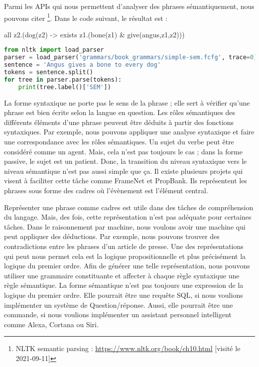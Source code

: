 \documentclass{KodeBook}
\begin{document}
Parmi les APIs qui nous permettent d'analyser des phrases sémantiquement, nous pouvons citer \footnote{NLTK semantic parsing : \url{https://www.nltk.org/book/ch10.html} [visité le 2021-09-11]}. 
Dans le code suivant, le résultat est : \\
\begin{center}
	all z2.(dog(z2) -> exists z1.(bone(z1) \& give(angus,z1,z2)))
\end{center}

\begin{lstlisting}[language=Python, style=codeStyle]
from nltk import load_parser
parser = load_parser('grammars/book_grammars/simple-sem.fcfg', trace=0)
sentence = 'Angus gives a bone to every dog'
tokens = sentence.split()
for tree in parser.parse(tokens):
    print(tree.label()['SEM'])
\end{lstlisting}


\begin{discussion}
La forme syntaxique ne porte pas le sens de la phrase ; elle sert à vérifier qu'une phrase est bien écrite selon la langue en question. 
Les rôles sémantiques des différents éléments d'une phrase peuvent être déduits à partir des fonctions syntaxiques. 
Par exemple, nous pouvons appliquer une analyse syntaxique et faire une correspondance avec les rôles sémantiques. 
Un sujet du verbe peut être considéré comme un agent. 
Mais, cela n'est pas toujours le cas ; dans la forme passive, le sujet est un patient. 
Donc, la transition du niveau syntaxique vers le niveau sémantique n'est pas aussi simple que ça. 
Il existe plusieurs projets qui visent à faciliter cette tâche comme FrameNet et PropBank. 
Ils représentent les phrases sous forme des cadres où l'évènement est l'élément central. 

Représenter une phrase comme cadres est utile dans des tâches de compréhension du langage. 
Mais, des fois, cette représentation n'est pas adéquate pour certaines tâches. 
Dans le raisonnement par machine, nous voulons avoir une machine qui peut appliquer des déductions. 
Par exemple, nous pouvons trouver des contradictions entre les phrases d'un article de presse. 
Une des représentations qui peut nous permet cela est la logique propositionnelle et plus précisément la logique du premier ordre. 
Afin de générer une telle représentation, nous pouvons utiliser une grammaire constituante et affecter à chaque règle syntaxique une règle sémantique.
La forme sémantique n'est pas toujours une expression de la logique du premier ordre. 
Elle pourrait être une requête SQL, si nous voulions implémenter un système de Question/réponse. 
Aussi, elle pourrait être une commande, si nous voulions implémenter un assistant personnel intelligent comme Alexa, Cortana ou Siri.
\end{discussion}

\ifx\wholebook\relax\else
% 
% 
	
\end{document}
